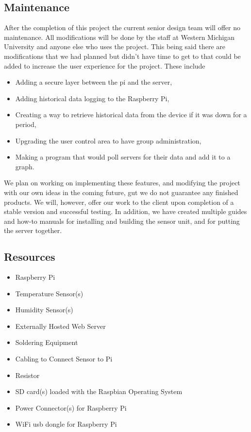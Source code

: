 \documentclass{report}
\begin{document}
\subsection*{Maintenance}
\indent
\indent
After the completion of this project the current senior design team will offer no maintenance. All modifications will be done by the staff at Western Michigan University and anyone else who uses the project. This being said there are modifications that we had planned but didn't have time to get to that could be added to increase the user experience for the project. These include
\begin{itemize}
	\item Adding a secure layer between the pi and the server,
	\item Adding historical data logging to the Raspberry Pi,
	\item Creating a way to retrieve historical data from the device if it was down for a period,
	\item Upgrading the user control area to have group administration,
	\item Making a program that would poll servers for their data and add it to a graph.
\end{itemize}
\indent
We plan on working on implementing these features, and modifying the project with our own ideas in the coming future, gut we do not guarantee any finished products. We will, however, offer our work to the client upon completion of a stable version and successful testing.
\newline
\indent
In addition, we have created multiple guides and how-to manuals for installing and building the sensor unit, and for putting the server together.
\newpage

\subsection*{Resources}

\begin{itemize}
	\item Raspberry Pi
	\item Temperature Sensor(s)
	\item Humidity Sensor(s)
	\item Externally Hosted Web Server
	\item Soldering Equipment
	\item Cabling to Connect Sensor to Pi
	\item Resistor
	\item SD card(s) loaded with the Raspbian Operating System
	\item Power Connector(s) for Raspberry Pi
	\item WiFi usb dongle for Raspberry Pi
\end{itemize}
\newpage
\end{document}
